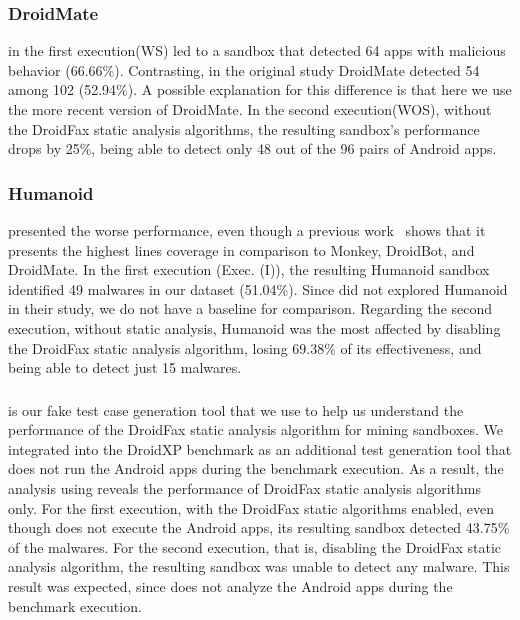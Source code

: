 \subsubsection*{DroidMate} in the first execution(WS) led to a sandbox that detected 64 apps with malicious behavior (66.66\%). Contrasting, in the original study DroidMate detected 54 among 102 (52.94\%). A possible explanation for this difference is that here we use the more recent version of DroidMate. In the second execution(WOS), without the DroidFax static analysis algorithms, the resulting sandbox's performance drops by 25\%, being able to detect only 48 out of the 96 pairs of Android apps. 


\subsubsection*{Humanoid} presented the worse performance, even though a previous
work~\cite{DBLP:conf/kbse/LiY0C19} shows that it presents the highest lines coverage in comparison to Monkey, DroidBot, and DroidMate. In the first execution (Exec. (I)), the resulting Humanoid sandbox identified 49 malwares in our dataset (51.04\%). Since \blls did not explored Humanoid in their study, we do not have a baseline for comparison. Regarding the second execution, without static analysis, Humanoid was the most affected by disabling the DroidFax static analysis algorithm, losing 69.38\% of its effectiveness, and being able to detect just 15 malwares.

\subsubsection*{\joke} is our fake test case generation tool that we use to help us understand the performance of the DroidFax static analysis algorithm for mining sandboxes. We integrated \joke into the DroidXP benchmark as an additional test generation tool that does not run the Android apps during the benchmark execution. As a result, the analysis using \joke reveals the performance of DroidFax static analysis algorithms only. For the first execution, with the DroidFax static algorithms enabled, even though \joke does not execute the Android apps, its resulting sandbox detected 43.75\% of the malwares. For the second execution, that is, disabling the DroidFax static analysis algorithm, the resulting \joke sandbox was unable to detect any malware. This result was expected, since \joke does not analyze the Android apps during the benchmark execution.

